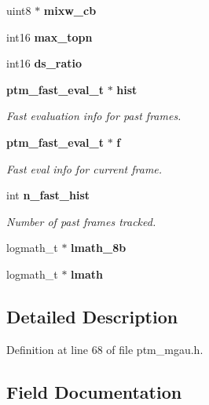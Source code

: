 \begin{DoxyCompactItemize}
\item 
uint8 $\ast$ {\bfseries mixw\+\_\+cb}\label{structptm__mgau__s_a5a3c76d47b94978f717a65fa0dfb54e8}

\item 
int16 {\bfseries max\+\_\+topn}\label{structptm__mgau__s_ab397cfdf51d309de4521edc09e80541d}

\item 
int16 {\bfseries ds\+\_\+ratio}\label{structptm__mgau__s_a2254b6ec79c97516b326ad33d22d0050}

\item 
{\bf ptm\+\_\+fast\+\_\+eval\+\_\+t} $\ast$ {\bf hist}
\begin{DoxyCompactList}\small\item\em Fast evaluation info for past frames. \end{DoxyCompactList}\item 
{\bf ptm\+\_\+fast\+\_\+eval\+\_\+t} $\ast$ {\bf f}
\begin{DoxyCompactList}\small\item\em Fast eval info for current frame. \end{DoxyCompactList}\item 
int {\bf n\+\_\+fast\+\_\+hist}
\begin{DoxyCompactList}\small\item\em Number of past frames tracked. \end{DoxyCompactList}\item 
logmath\+\_\+t $\ast$ {\bfseries lmath\+\_\+8b}\label{structptm__mgau__s_ad577181af2afca66f33f1f1e4c576ae8}

\item 
logmath\+\_\+t $\ast$ {\bfseries lmath}\label{structptm__mgau__s_abbaabfb8678356673a2c0a515e33a378}

\end{DoxyCompactItemize}


\subsection{Detailed Description}


Definition at line 68 of file ptm\+\_\+mgau.\+h.



\subsection{Field Documentation}
